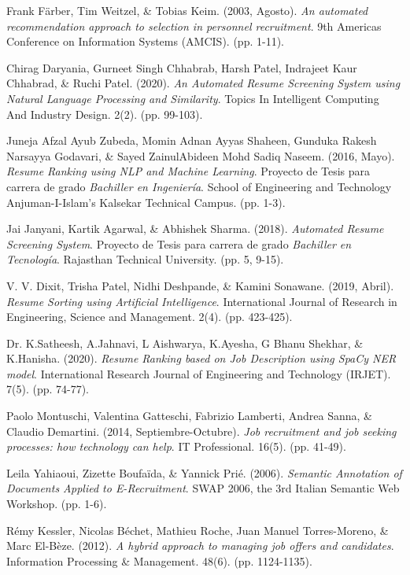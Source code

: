 \documentclass[12pt,a4paper]{article}
\begin{document}
\begin{sloppypar}
\begin{thebibliography}{9}
Frank Färber, Tim Weitzel, \& Tobias Keim. (2003, Agosto). \textit{An automated recommendation approach to selection in personnel recruitment}. 9th Americas Conference on Information Systems (AMCIS). (pp. 1-11).

Chirag Daryania, Gurneet Singh Chhabrab, Harsh Patel, Indrajeet Kaur Chhabrad, \& Ruchi Patel. (2020). \textit{An Automated Resume Screening System using Natural Language Processing and Similarity}. Topics In Intelligent Computing And Industry Design. 2(2). (pp. 99-103).

Juneja Afzal Ayub Zubeda, Momin Adnan Ayyas Shaheen, Gunduka Rakesh Narsayya Godavari, \& Sayed ZainulAbideen Mohd Sadiq Naseem. (2016, Mayo). \textit{Resume Ranking using NLP and Machine Learning}. Proyecto de Tesis para carrera de grado \textit{Bachiller en Ingeniería}. School of Engineering and Technology Anjuman-I-Islam’s Kalsekar Technical Campus. (pp. 1-3).

Jai Janyani, Kartik Agarwal, \& Abhishek Sharma. (2018). \textit{Automated Resume Screening System}. Proyecto de Tesis para carrera de grado \textit{Bachiller en Tecnología}. Rajasthan Technical University. (pp. 5, 9-15).

V. V. Dixit, Trisha Patel, Nidhi Deshpande, \& Kamini Sonawane. (2019, Abril). \textit{Resume Sorting using Artificial Intelligence}. International Journal of Research in Engineering, Science and Management. 2(4). (pp. 423-425).

Dr. K.Satheesh, A.Jahnavi, L Aishwarya, K.Ayesha, G Bhanu Shekhar, \& K.Hanisha. (2020). \textit{Resume Ranking based on Job Description using SpaCy NER model}. International Research Journal of Engineering and Technology (IRJET). 7(5). (pp. 74-77).

Paolo Montuschi, Valentina Gatteschi, Fabrizio Lamberti,   Andrea Sanna, \&  Claudio Demartini. (2014, Septiembre-Octubre). \textit{Job recruitment and job seeking processes: how technology can help}. IT Professional. 16(5). (pp. 41-49).

Leila Yahiaoui, Zizette Boufaïda, \& Yannick Prié. (2006). \textit{Semantic Annotation of Documents Applied to E-Recruitment}. SWAP 2006, the 3rd Italian Semantic Web Workshop. (pp. 1-6).

Rémy Kessler, Nicolas Béchet, Mathieu Roche, Juan Manuel Torres-Moreno, \& Marc El-Bèze. (2012). \textit{A hybrid approach to managing job offers and candidates}. Information Processing \& Management. 48(6). (pp. 1124-1135).


\end{thebibliography}
\end{sloppypar}
\end{document}

